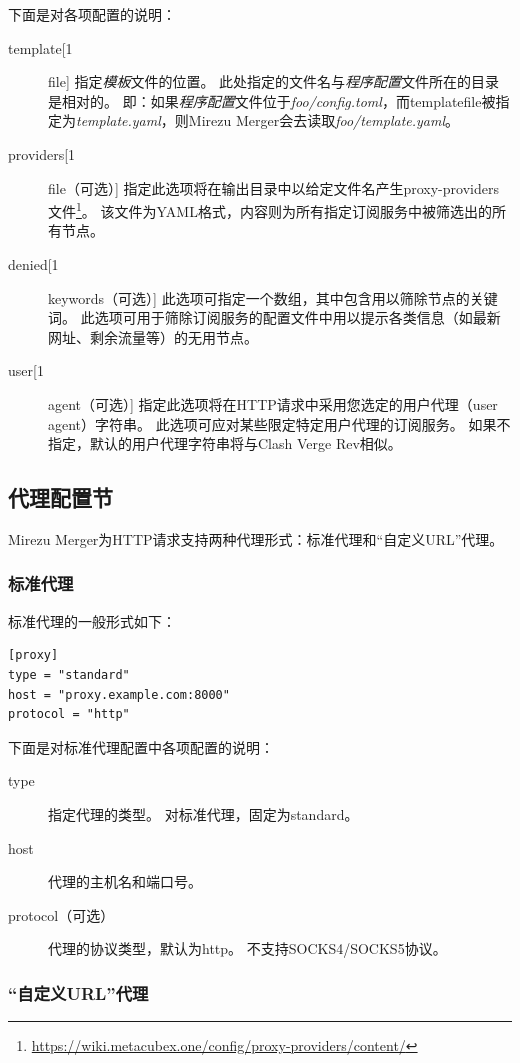 \documentclass[a4paper,fontset=founder,punct=kaiming]{ctexart}
\renewcommand\_{\textunderscore\linebreak[1]}
\newcommand{\productname}{Mirezu Merger}
\begin{document}
下面是对各项配置的说明：
\begin{description}
\item[template\_file] 指定\emph{模板}文件的位置。
  此处指定的文件名与\emph{程序配置}文件所在的目录是相对的。
  即：如果\emph{程序配置}文件位于\emph{foo/config.toml}，而template\_file被指定为\emph{template.yaml}，则\productname 会去读取\emph{foo/template.yaml}。
\item[providers\_file（可选）] 指定此选项将在输出目录中以给定文件名产生proxy-providers文件\footnote{\url{https://wiki.metacubex.one/config/proxy-providers/content/}}。
  该文件为YAML格式，内容则为所有指定订阅服务中被筛选出的所有节点。
\item[denied\_keywords（可选）] 此选项可指定一个数组，其中包含用以筛除节点的关键词。
  此选项可用于筛除订阅服务的配置文件中用以提示各类信息（如最新网址、剩余流量等）的无用节点。
\item[user\_agent（可选）] 指定此选项将在HTTP请求中采用您选定的用户代理（user agent）字符串。
  此选项可应对某些限定特定用户代理的订阅服务。
  如果不指定，默认的用户代理字符串将与Clash Verge Rev相似。
\end{description}

\subsection{代理配置节}
\label{sec:proxyconf}

\productname 为HTTP请求支持两种代理形式：标准代理和“自定义URL”代理。

\subsubsection{标准代理}
\label{sec:stdproxy}

标准代理的一般形式如下：
\begin{verbatim}
[proxy]
type = "standard"
host = "proxy.example.com:8000"
protocol = "http"
\end{verbatim}

下面是对标准代理配置中各项配置的说明：
\begin{description}
\item[type] 指定代理的类型。
  对标准代理，固定为standard。
\item[host] 代理的主机名和端口号。
\item[protocol（可选）] 代理的协议类型，默认为http。
  不支持SOCKS4/SOCKS5协议。
\end{description}

\subsubsection{“自定义URL”代理}
\label{sec:urlproxy}
\end{document}
